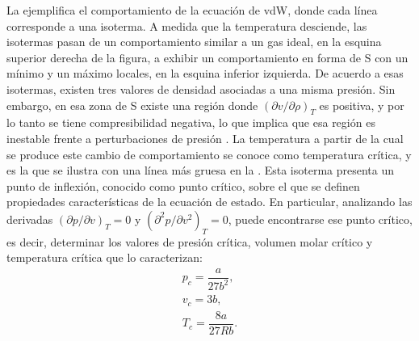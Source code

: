 La  ejemplifica el comportamiento de la ecuaci\'on de vdW, donde cada l\'inea corresponde a una isoterma. A medida que la temperatura desciende, las isotermas pasan de un comportamiento similar a un gas ideal, en la esquina superior derecha de la figura, a exhibir un comportamiento en forma de S con un m\'inimo y un m\'aximo locales, en la esquina inferior izquierda. De acuerdo a esas isotermas, existen tres valores de densidad asociadas a una misma presi\'on. Sin embargo, en esa zona de S existe una regi\'on donde $(\partial v / \partial \rho)_T$ es positiva, y por lo tanto se tiene compresibilidad negativa, lo que implica que esa regi\'on es inestable frente a perturbaciones de presi\'on \cite{blundell_concepts_2006}.
La temperatura a partir de la cual se produce este cambio de comportamiento se conoce como temperatura cr\'itica, y es la que se ilustra con una l\'inea m\'as gruesa en la . Esta isoterma presenta un punto de inflexi\'on, conocido como punto cr\'itico, sobre el que se definen propiedades caracter\'isticas de la ecuaci\'on de estado. En particular, analizando las derivadas $(\partial p / \partial v)_T = 0$ y $(\partial^2 p / \partial v^2)_T = 0$, puede encontrarse ese punto cr\'itico, es decir, determinar los valores de presi\'on cr\'itica, volumen molar cr\'itico y temperatura cr\'itica que lo caracterizan:
\begin{equation}
	\begin{gathered}
		p_c = \dfrac{a}{27 b^2}, \\
		v_c = 3b, \\
		T_c = \dfrac{8 a}{27 R b}.
	\end{gathered}
	\label{eq:vdw_param_crit}
\end{equation}


